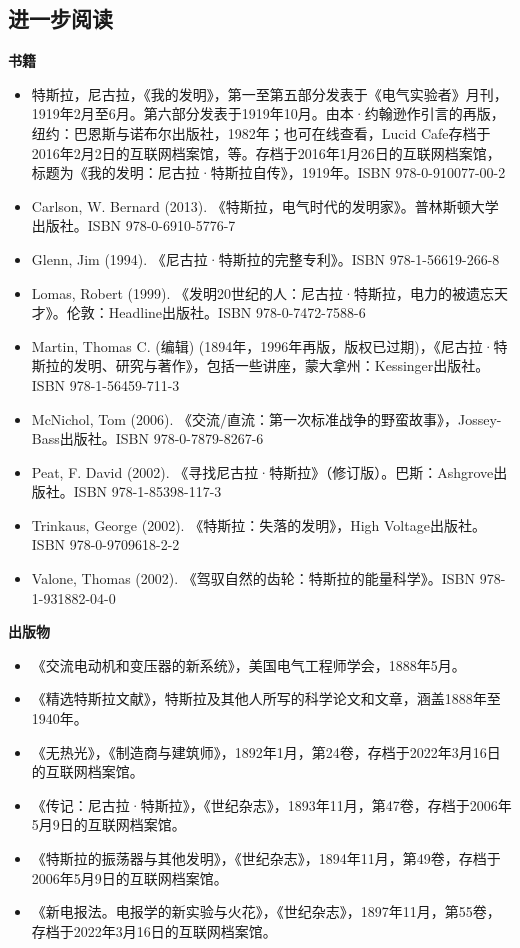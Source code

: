 \subsection{进一步阅读}
\textbf{书籍}
\begin{itemize}
\item 特斯拉，尼古拉，《我的发明》，第一至第五部分发表于《电气实验者》月刊，1919年2月至6月。第六部分发表于1919年10月。由本·约翰逊作引言的再版，纽约：巴恩斯与诺布尔出版社，1982年；也可在线查看，Lucid Cafe存档于2016年2月2日的互联网档案馆，等。存档于2016年1月26日的互联网档案馆，标题为《我的发明：尼古拉·特斯拉自传》，1919年。ISBN 978-0-910077-00-2  
\item Carlson, W. Bernard (2013). 《特斯拉，电气时代的发明家》。普林斯顿大学出版社。ISBN 978-0-6910-5776-7  
\item Glenn, Jim (1994). 《尼古拉·特斯拉的完整专利》。ISBN 978-1-56619-266-8  
\item Lomas, Robert (1999). 《发明20世纪的人：尼古拉·特斯拉，电力的被遗忘天才》。伦敦：Headline出版社。ISBN 978-0-7472-7588-6  
\item Martin, Thomas C. (编辑) (1894年，1996年再版，版权已过期)，《尼古拉·特斯拉的发明、研究与著作》，包括一些讲座，蒙大拿州：Kessinger出版社。ISBN 978-1-56459-711-3  
\item McNichol, Tom (2006). 《交流/直流：第一次标准战争的野蛮故事》，Jossey-Bass出版社。ISBN 978-0-7879-8267-6  
\item Peat, F. David (2002). 《寻找尼古拉·特斯拉》（修订版）。巴斯：Ashgrove出版社。ISBN 978-1-85398-117-3  
\item Trinkaus, George (2002). 《特斯拉：失落的发明》，High Voltage出版社。ISBN 978-0-9709618-2-2  
\item Valone, Thomas (2002). 《驾驭自然的齿轮：特斯拉的能量科学》。ISBN 978-1-931882-04-0
\end{itemize}
\textbf{出版物}
\begin{itemize}
\item 《交流电动机和变压器的新系统》，美国电气工程师学会，1888年5月。
\item 《精选特斯拉文献》，特斯拉及其他人所写的科学论文和文章，涵盖1888年至1940年。
\item 《无热光》，《制造商与建筑师》，1892年1月，第24卷，存档于2022年3月16日的互联网档案馆。
\item 《传记：尼古拉·特斯拉》，《世纪杂志》，1893年11月，第47卷，存档于2006年5月9日的互联网档案馆。
\item 《特斯拉的振荡器与其他发明》，《世纪杂志》，1894年11月，第49卷，存档于2006年5月9日的互联网档案馆。
\item 《新电报法。电报学的新实验与火花》，《世纪杂志》，1897年11月，第55卷，存档于2022年3月16日的互联网档案馆。
\end{itemize}

